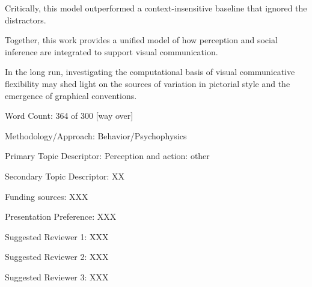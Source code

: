 \documentclass{article}
\begin{document}
Critically, this model outperformed a context-insensitive baseline that ignored the distractors. 

Together, this work provides a unified model of how perception and social inference are integrated to support visual communication. 

In the long run, investigating the computational basis of visual communicative flexibility may shed light on the sources of variation in pictorial style and the emergence of graphical conventions.


\vspace{3mm}

\begin{description}  
\item Word Count: 364 of 300 [way over]
\item Methodology/Approach: Behavior/Psychophysics
\item Primary Topic Descriptor: Perception and action: other
\item Secondary Topic Descriptor: XX
\item Funding sources: XXX
\item Presentation Preference: XXX
\item Suggested Reviewer 1: XXX
\item Suggested Reviewer 2: XXX
\item Suggested Reviewer 3: XXX
\end{description}
\end{document}
